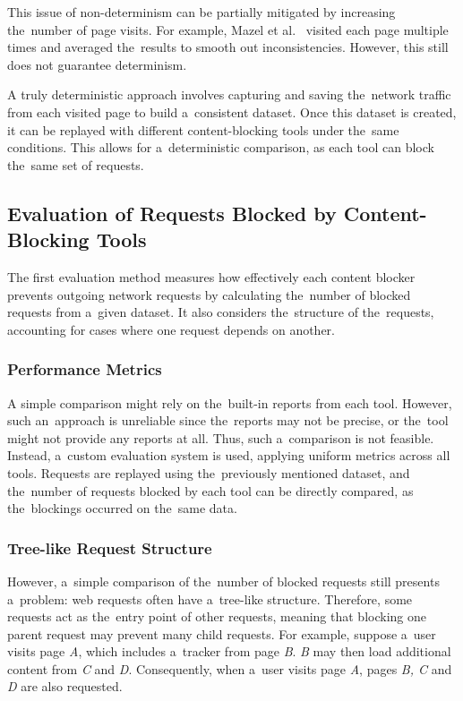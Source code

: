 This issue of non-determinism can be partially mitigated by increasing the~number of page visits. For example, Mazel et al.~\cite{comparison-mazel} visited each page multiple times and averaged the~results to smooth out inconsistencies. However, this still does not guarantee determinism.

A truly deterministic approach involves capturing and saving the~network traffic from each visited page to build a~consistent dataset. Once this dataset is created, it can be replayed with different content-blocking tools under the~same conditions. This allows for a~deterministic comparison, as each tool can block the~same set of requests.

\subsection{Evaluation of Requests Blocked by Content-Blocking Tools}
\label{comparison-3}
The first evaluation method measures how effectively each content blocker prevents outgoing network requests by calculating the~number of blocked requests from a~given dataset. It also considers the~structure of the~requests, accounting for cases where one request depends on another.

\subsubsection{Performance Metrics}
A simple comparison might rely on the~built-in reports from each tool. However, such an~approach is unreliable since the~reports may not be precise, or the~tool might not provide any reports at all. Thus, such a~comparison is not feasible. Instead, a~custom evaluation system is used, applying uniform metrics across all tools. Requests are replayed using the~previously mentioned dataset, and the~number of requests blocked by each tool can be directly compared, as the~blockings occurred on the~same data.

\subsubsection{Tree-like Request Structure}

However, a~simple comparison of the~number of blocked requests still presents a~problem: web requests often have a~tree-like structure. Therefore, some requests act as the~entry point of other requests, meaning that blocking one parent request may prevent many child requests. For example, suppose a~user visits page \emph{A}, which includes a~tracker from page \emph{B}. \emph{B} may then load additional content from \emph{C} and \emph{D}. Consequently, when a~user visits page \emph{A}, pages \emph{B, C} and \emph{D} are also requested.

